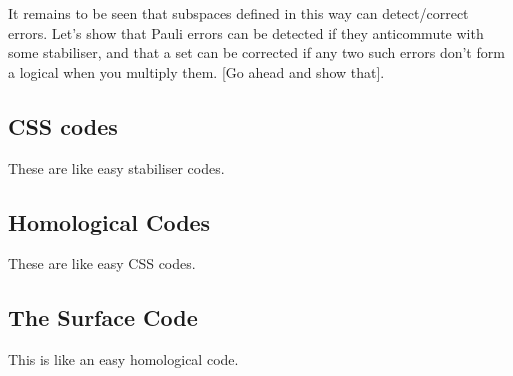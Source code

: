 \documentclass[10pt,a4paper, english]{scrartcl}
\begin{document}
It remains to be seen that subspaces defined in this way can detect/correct errors.
Let's show that Pauli errors can be detected if they anticommute with some stabiliser, and that a set can be corrected if any two such errors don't form a logical when you multiply them.
[Go ahead and show that].
\subsection{CSS codes}
These are like easy stabiliser codes.
\subsection{Homological Codes}
These are like easy CSS codes.
\subsection{The Surface Code}
This is like an easy homological code.
\end{document}
